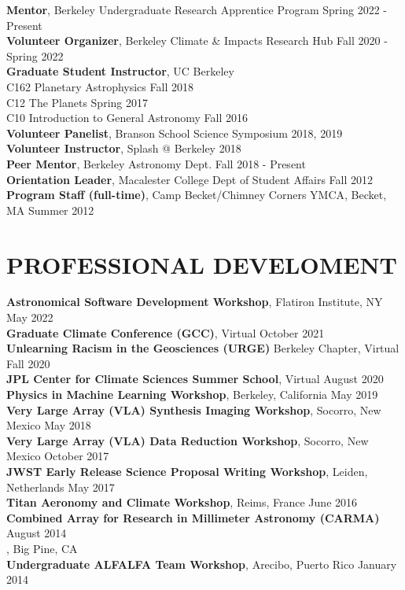 \documentclass[margin, 10pt]{res} %
\newcommand\tab[1][1cm]{\hspace*{#1}}
\begin{document}
\begin{resume}
{\bf Mentor}, Berkeley Undergraduate Research Apprentice Program \hfill Spring 2022 - Present \\
{\bf Volunteer Organizer}, Berkeley Climate \& Impacts Research Hub \hfill Fall 2020 - Spring 2022 \\
{\bf Graduate Student Instructor}, UC Berkeley \\
\tab C162 Planetary Astrophysics \hfill Fall 2018 \\
\tab C12 The Planets \hfill  Spring 2017 \\
\tab C10 Introduction to General Astronomy \hfill Fall 2016 \\
{\bf Volunteer Panelist}, Branson School Science Symposium \hfill 2018, 2019 \\
{\bf Volunteer Instructor}, Splash @ Berkeley \hfill 2018 \\
{\bf Peer Mentor}, Berkeley Astronomy Dept.
\hfill Fall 2018 - Present \\
{\bf Orientation Leader}, Macalester College Dept of Student Affairs
\hfill Fall 2012 \\
{\bf Program Staff (full-time)}, Camp Becket/Chimney Corners YMCA,
Becket, MA
\hfill Summer 2012



\section{PROFESSIONAL DEVELOMENT}

{\bf Astronomical Software Development Workshop}, Flatiron Institute, NY \hfill May 2022 \\ 
{\bf Graduate Climate Conference (GCC)}, Virtual \hfill October 2021 \\ 
{\bf Unlearning Racism in the Geosciences (URGE)} Berkeley Chapter, Virtual \hfill Fall 2020 \\ 
{\bf JPL Center for Climate Sciences Summer School}, Virtual \hfill August 2020 \\ 
{\bf Physics in Machine Learning Workshop}, Berkeley, California \hfill May 2019 \\
{\bf Very Large Array (VLA) Synthesis Imaging Workshop}, Socorro, New Mexico \hfill May 2018 \\
{\bf Very Large Array (VLA) Data Reduction Workshop}, Socorro, New Mexico \hfill October 2017 \\
{\bf JWST Early Release Science Proposal Writing Workshop}, Leiden, Netherlands \hfill May 2017 \\
{\bf Titan Aeronomy and Climate Workshop}, Reims, France \hfill June 2016 \\
{\bf Combined Array for Research in Millimeter Astronomy (CARMA)} \hfill August 2014 \\
  \tab {\bf Summer School}, Big Pine, CA  \\
{\bf Undergraduate ALFALFA Team Workshop}, Arecibo, Puerto Rico \hfill January 2014



\end{resume}
\end{document}
